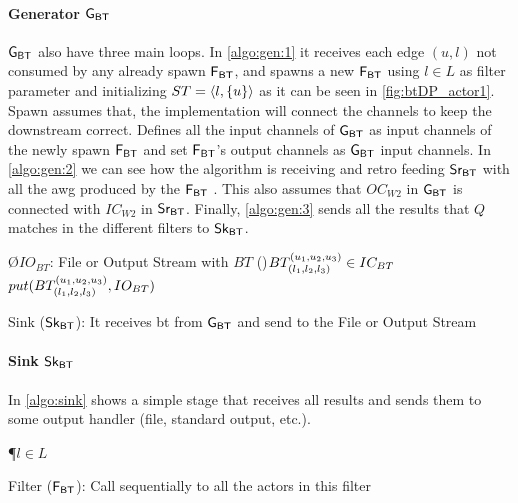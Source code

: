 \paragraph{Generator $\mathsf{G_{BT}}$} $\mathsf{G_{BT}}$ also have three main loops. In \autoref{algo:gen:1} it receives each edge $(u,l)$ not consumed by any already spawn  $\fbt$, and 
spawns a new $\fbt$ using $l \in L$ as filter parameter and initializing $ST = \left\langle l, \{u\} \right\rangle$ as it can be seen in \autoref{fig:btDP_actor1}. 
Spawn assumes that, the implementation will connect the channels to keep the downstream correct. Defines all the input channels of $\mathsf{G_{BT}}$ as input channels of the newly spawn $\fbt$ and set $\fbt$'s output channels as $\mathsf{G_{BT}}$ input channels.
In \autoref{algo:gen:2} we can see how the algorithm is receiving and retro feeding $\mathsf{Sr_{BT}}$ with all the \acrshort{awg} produced by the $\fbt$ . This also assumes that $OC_{W2}$ in $\mathsf{G_{BT}}$ 
is connected with $IC_{W2}$ in $\mathsf{Sr_{BT}}$.
Finally, \autoref{algo:gen:3} sends all the results that $Q$ matches in the different filters to $\obt$.

\begin{algorithm}[h!]
\SetAlgoRefName{[A3]}
\O{$IO_{BT}$: File or Output Stream with $BT$}
\ForAll(){$BT_{(l_1, l_2,l_3)}^{(u_1, u_2, u_3)} \in IC_{BT}$}
{$put(BT_{(l_1, l_2,l_3)}^{(u_1, u_2, u_3)}, IO_{BT})$
}
\caption[Sink ($\obt$)]{Sink ($\obt$): It receives \acrshort{bt} from $\mathsf{G_{BT}}$ and send to the File or Output Stream}
\label{algo:sink}
\end{algorithm}

\paragraph{Sink $\obt$} In \autoref{algo:sink} shows a simple stage that receives all results and sends them to some output handler (file, standard output, etc.). 

\begin{algorithm}[h!]
\SetAlgoRefName{[A4]}
\P{$l \in L$}
\df{\filter{}}{
      $\actora()$\\
      $\actorb()$\\
      $\actorc()$\\
      $\actord()$\\
}
\caption[Filter ($\fbt$)]{Filter ($\fbt$): Call sequentially to all the actors in this filter}
\label{algo:fil}
\end{algorithm}

